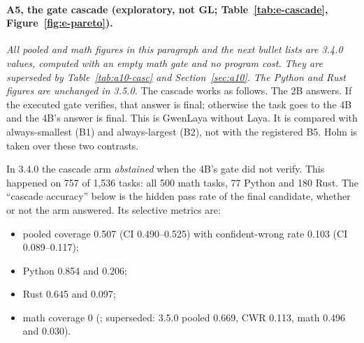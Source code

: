 \documentclass[11pt,a4paper]{article}
\newcommand{\code}[1]{\texttt{\detokenize{#1}}}
\begin{document}
\paragraph{A5, the gate cascade (exploratory, not GL; Table~\ref{tab:e-cascade}, Figure~\ref{fig:e-pareto}).}
\emph{All pooled and math figures in this paragraph and the next bullet lists are 3.4.0 values, computed with an empty math
gate and no program cost. They are superseded by Table~\ref{tab:a10-casc} and Section~\ref{sec:a10}. The Python and Rust figures
are unchanged in 3.5.0.}
The cascade works as follows. The 2B answers. If the executed gate verifies, that answer is final;
otherwise the task goes to the 4B and the 4B's answer is final. This is GwenLaya without Laya. It
is compared with always-smallest (B1) and always-largest (B2), not with the registered B5. Holm is
taken over these two contrasts.

In 3.4.0 the cascade arm \emph{abstained} when the 4B's gate did not verify. This happened on 757 of 1,536
tasks: all 500 math tasks, 77 Python and 180 Rust. The ``cascade accuracy'' below is the hidden pass
rate of the final candidate, whether or not the arm answered. Its selective metrics are:
\begin{itemize}
\item pooled coverage 0.507 (CI 0.490--0.525) with confident-wrong rate 0.103 (CI 0.089--0.117);
\item Python 0.854 and 0.206;
\item Rust 0.645 and 0.097;
\item math coverage 0 (\code{A5.cascade_selective_*}; superseded: 3.5.0 pooled 0.669, CWR 0.113, math 0.496 and 0.030).
\end{itemize}
\end{document}
